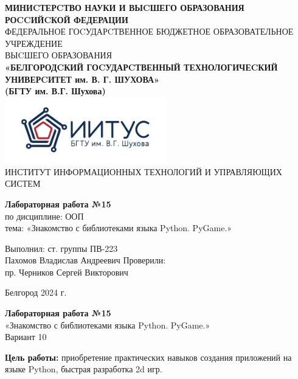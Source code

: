 \documentclass[a4paper,14pt]{extarticle}
\newcommand\textbox[1]{
	\parbox{.45\textwidth}{#1}
}
\begin{document}
\begin{center}
    \small{
        \textbf{МИНИCТЕРCТВО НАУКИ И ВЫCШЕГО ОБРАЗОВАНИЯ РОCCИЙCКОЙ ФЕДЕРАЦИИ}\\
        ФЕДЕРАЛЬНОЕ ГОCУДАРCТВЕННОЕ БЮДЖЕТНОЕ ОБРАЗОВАТЕЛЬНОЕ УЧРЕЖДЕНИЕ\\ВЫCШЕГО ОБРАЗОВАНИЯ \\
        \textbf{«БЕЛГОРОДCКИЙ ГОCУДАРCТВЕННЫЙ ТЕХНОЛОГИЧЕCКИЙ\\УНИВЕРCИТЕТ им. В. Г. ШУХОВА»\\ (БГТУ им. В.Г. Шухова)} \\
        \bigbreak
        \includegraphics[width=70mm]{log}\\
        ИНСТИТУТ ИНФОРМАЦИОННЫХ ТЕХНОЛОГИЙ И УПРАВЛЯЮЩИХ СИСТЕМ\\}
\end{center}

\vfill
\begin{center}
    \large{
        \textbf{
            Лабораторная работа №15}}\\
    \normalsize{
        по дисциплине: ООП \\
        тема: «Знакомство с библиотеками языка Python. PyGame.»}
\end{center}
\vfill
\hfill\textbox{
    Выполнил: ст. группы ПВ-223\\Пахомов Владислав Андреевич
    \bigbreak
    Проверили: \\пр. Черников Сергей Викторович
}
\vfill\begin{center}
    Белгород 2024 г.
\end{center}
\newpage
\begin{center}
    \textbf{Лабораторная работа №15}\\
    «Знакомство с библиотеками языка Python. PyGame.»\\
    Вариант 10
\end{center}
\textbf{Цель работы: }приобретение практических навыков создания приложений на
языке Python, быстрая разработка 2d игр.\\
\end{document}
